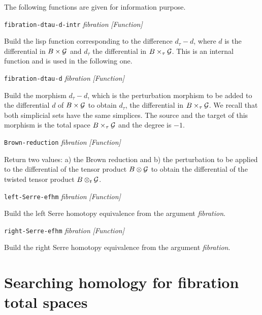 The following functions are given for information purpose.
\vskip 0.35cm
{\parindent=0mm
{\leftskip=5mm
{\tt fibration-dtau-d-intr} {\em fibration}  \hfill {\em [Function]} \par}
{\leftskip=15mm
Build the lisp function corresponding to the difference $d_\tau - d$, where $d$ is the differential
in $B \times {\cal G}$ and $d_\tau$ the differential in $B \times_\tau {\cal G}$. This is an internal
function and is used in the following one. \par}
{\leftskip=5mm
{\tt fibration-dtau-d} {\em fibration}  \hfill {\em [Function]} \par}
{\leftskip=15mm
Build the morphism $d_\tau-d$, which is the perturbation morphism to be added to
the differential  $d$ of $B \times {\cal G}$  to obtain  $d_\tau$,
the differential in $B \times_\tau {\cal G}$. We recall that both simplicial sets have
the same simplices. The source and the target of this morphism is the total space
$B \times_\tau {\cal G}$ and the degree is $-1$. \par}
{\leftskip=5mm
{\tt Brown-reduction} {\em fibration}  \hfill {\em [Function]} \par}
{\leftskip=15mm
Return two values: a) the Brown reduction and b) the  perturbation to be applied to the differential of the tensor
product $B \otimes {\cal G}$  to obtain the differential of the twisted tensor
product $B \otimes_t {\cal G}$. \par}
{\leftskip=5mm
{\tt left-Serre-efhm} {\em fibration}  \hfill {\em [Function]} \par}
{\leftskip=15mm
Build the left Serre homotopy equivalence from the argument {\em fibration}. \par}
{\leftskip=5mm
{\tt right-Serre-efhm} {\em fibration}  \hfill {\em [Function]} \par}
{\leftskip=15mm
Build the right Serre homotopy equivalence from the argument {\em fibration}. \par}
}

\section {Searching homology for fibration total spaces}

